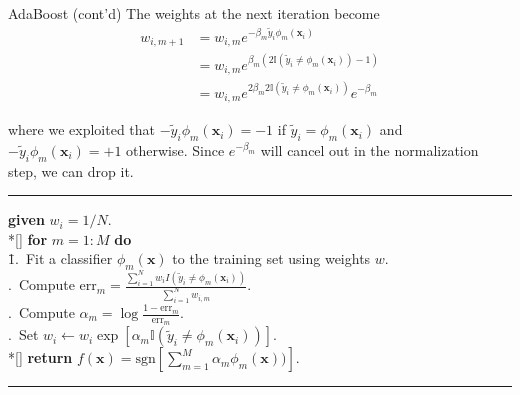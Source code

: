 \documentclass[10pt,mathserif]{beamer}
\begin{document}
\begin{frame}{AdaBoost (cont'd)}
The weights at the next iteration become
\begin{equation*}
    \begin{split}
        w_{i,m+1} & = w_{i,m}e^{-\beta_m \tilde{y}_i\phi_m(\bm{x}_i)}\\
        & = w_{i,m}e^{\beta_m(2\mathbb{I}(\tilde{y}_i\neq\phi_m(\bm{x}_i))-1)}\\
        & = w_{i,m}e^{2\beta_m2\mathbb{I}(\tilde{y}_i\neq\phi_m(\bm{x}_i))}e^{-\beta_m}
    \end{split}
\end{equation*}
    
where we exploited that $-\tilde{y}_i\phi_m(\bm{x}_i) = -1$ if $\tilde{y}_i = \phi_m(\bm{x}_i)$ and $-\tilde{y}_i\phi_m(\bm{x}_i) = +1$ otherwise. Since $e^{-\beta_m}$ will cancel out in the normalization step, we can drop it. 

\noindent\rule[-5pt]{\textwidth}{0.4pt}
{\footnotesize
\begin{tabbing}
    {\bf given} $w_i= 1/N$. \\*[\smallskipamount]
    {\bf for} $m=1:M$ {\bf do}\\
    \qquad \= 1.\ Fit a classifier $\phi_m(\bm{x})$ to the training set using weights $w$. \\
    .\ Compute $\text{err}_m = \frac{\sum_{i=1}^N w_i I(\tilde{y}_i \neq \phi_m(\bm{x}_i))}{\sum_{i=1}^N w_{i,m}}$. \\
    .\ Compute $\alpha_m = \log\frac{1-\text{err}_m}{\text{err}_m}$. \\
    .\ Set $w_i\leftarrow w_i\exp\left[\alpha_m\mathbb{I}(\tilde{y}_i\neq\phi_m(\bm{x}_i))\right]$. \\*[\smallskipamount]
    {\bf return} $f(\bm{x})=\text{sgn}\left[\sum_{m=1}^M\alpha_m\phi_m(\bm{x}))\right]$.
\end{tabbing}}
\noindent\rule[10pt]{\textwidth}{0.4pt}
\end{frame}
\end{document}
